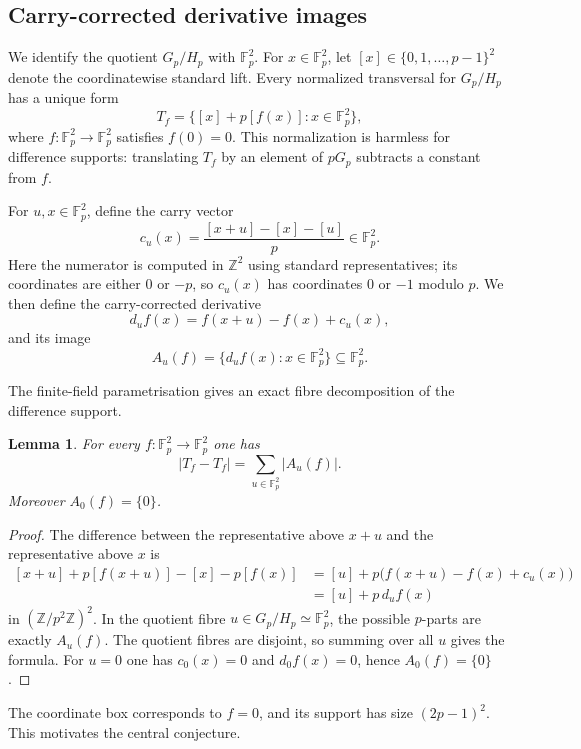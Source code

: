 \documentclass[reqno]{amsart}
\numberwithin{equation}{section}
\newtheorem{lemma}[theorem]{Lemma}
\theoremstyle{definition}
\begin{document}
\subsection{Carry-corrected derivative images}
\label{subsec:carry-corrected-derivatives}

We identify the quotient $G_p/H_p$ with $\mathbb F_p^2$.  For
$x\in\mathbb F_p^2$, let $[x]\in\{0,1,\ldots,p-1\}^2$ denote the coordinatewise
standard lift.  Every normalized transversal for $G_p/H_p$ has a unique form
\[
  T_f=\{[x]+p[f(x)]:x\in\mathbb F_p^2\},
\]
where $f:\mathbb F_p^2\to\mathbb F_p^2$ satisfies $f(0)=0$.  This normalization
is harmless for difference supports: translating $T_f$ by an element of $pG_p$
subtracts a constant from $f$.

For $u,x\in\mathbb F_p^2$, define the carry vector
\[
  c_u(x)=\frac{[x+u]-[x]-[u]}{p}\in\mathbb F_p^2.
\]
Here the numerator is computed in $\mathbb Z^2$ using standard representatives;
its coordinates are either $0$ or $-p$, so $c_u(x)$ has coordinates $0$ or $-1$
modulo $p$.  We then define the carry-corrected derivative
\[
  d_u f(x)=f(x+u)-f(x)+c_u(x),
\]
and its image
\[
  A_u(f)=\{d_u f(x):x\in\mathbb F_p^2\}\subseteq\mathbb F_p^2.
\]

The finite-field parametrisation gives an exact fibre decomposition of the
difference support.
\begin{lemma}
\label{lem:square-plane-fibre-decomposition}
For every $f:\mathbb F_p^2\to\mathbb F_p^2$ one has
\[
  |T_f-T_f|=\sum_{u\in\mathbb F_p^2}|A_u(f)|.
\]
Moreover $A_0(f)=\{0\}$.
\end{lemma}

\begin{proof}
The difference between the representative above $x+u$ and the representative
above $x$ is
\[
\begin{aligned}
  {[x+u]}+p[f(x+u)]-[x]-p[f(x)]
  &= [u]+p\bigl(f(x+u)-f(x)+c_u(x)\bigr) \\
  &= [u]+p\,d_u f(x)
\end{aligned}
\]
in $(\mathbb Z/p^2\mathbb Z)^2$.  In the quotient fibre
$u\in G_p/H_p\simeq\mathbb F_p^2$, the possible $p$-parts are exactly
$A_u(f)$.  The quotient fibres are disjoint, so summing over all $u$ gives the
formula.  For $u=0$ one has $c_0(x)=0$ and
$d_0f(x)=0$, hence $A_0(f)=\{0\}$.
\end{proof}

The coordinate box corresponds to $f=0$, and its support has size
$(2p-1)^2$.  This motivates the central conjecture.
\end{document}
